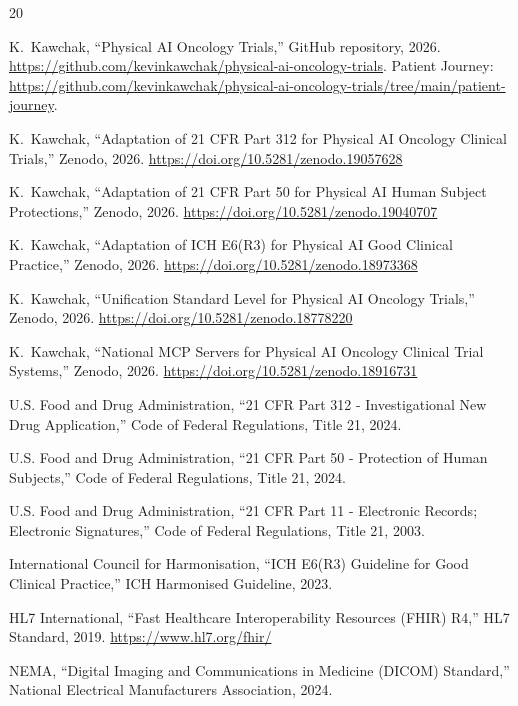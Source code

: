 \documentclass{article}
\begin{document}
\begin{thebibliography}{20}

K.~Kawchak, ``Physical AI Oncology Trials,'' GitHub repository, 2026.
\url{https://github.com/kevinkawchak/physical-ai-oncology-trials}. Patient Journey: \url{https://github.com/kevinkawchak/physical-ai-oncology-trials/tree/main/patient-journey}.

K.~Kawchak, ``Adaptation of 21 CFR Part 312 for Physical AI Oncology Clinical Trials,'' Zenodo, 2026.
\url{https://doi.org/10.5281/zenodo.19057628}

K.~Kawchak, ``Adaptation of 21 CFR Part 50 for Physical AI Human Subject Protections,'' Zenodo, 2026.
\url{https://doi.org/10.5281/zenodo.19040707}

K.~Kawchak, ``Adaptation of ICH E6(R3) for Physical AI Good Clinical Practice,'' Zenodo, 2026.
\url{https://doi.org/10.5281/zenodo.18973368}

K.~Kawchak, ``Unification Standard Level for Physical AI Oncology Trials,'' Zenodo, 2026.
\url{https://doi.org/10.5281/zenodo.18778220}

K.~Kawchak, ``National MCP Servers for Physical AI Oncology Clinical Trial Systems,'' Zenodo, 2026.
\url{https://doi.org/10.5281/zenodo.18916731}

U.S. Food and Drug Administration, ``21 CFR Part 312 - Investigational New Drug Application,'' Code of Federal Regulations, Title 21, 2024.

U.S. Food and Drug Administration, ``21 CFR Part 50 - Protection of Human Subjects,'' Code of Federal Regulations, Title 21, 2024.

U.S. Food and Drug Administration, ``21 CFR Part 11 - Electronic Records; Electronic Signatures,'' Code of Federal Regulations, Title 21, 2003.

International Council for Harmonisation, ``ICH E6(R3) Guideline for Good Clinical Practice,'' ICH Harmonised Guideline, 2023.

HL7 International, ``Fast Healthcare Interoperability Resources (FHIR) R4,'' HL7 Standard, 2019.
\url{https://www.hl7.org/fhir/}

NEMA, ``Digital Imaging and Communications in Medicine (DICOM) Standard,'' National Electrical Manufacturers Association, 2024.


\end{thebibliography}
\end{document}
